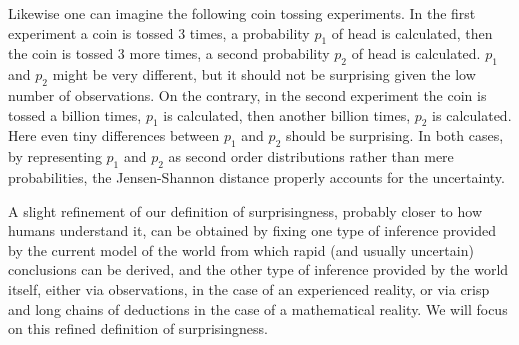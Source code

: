 \documentclass[runningheads]{llncs}
\begin{document}
Likewise one can imagine the following coin tossing experiments. In
the first experiment a coin is tossed 3 times, a probability $p_1$ of
head is calculated, then the coin is tossed 3 more times, a second
probability $p_2$ of head is calculated. $p_1$ and $p_2$ might be very
different, but it should not be surprising given the low number of
observations. On the contrary, in the second experiment the coin is
tossed a billion times, $p_1$ is calculated, then another billion
times, $p_2$ is calculated. Here even tiny differences between $p_1$
and $p_2$ should be surprising. In both cases, by representing $p_1$
and $p_2$ as second order distributions rather than mere
probabilities, the Jensen-Shannon distance properly accounts for the
uncertainty.

A slight refinement of our definition of surprisingness, probably
closer to how humans understand it, can be obtained by fixing one type
of inference provided by the current model of the world from which
rapid (and usually uncertain) conclusions can be derived, and the
other type of inference provided by the world itself, either via
observations, in the case of an experienced reality, or via crisp and
long chains of deductions in the case of a mathematical reality. We
will focus on this refined definition of surprisingness.
\end{document}
